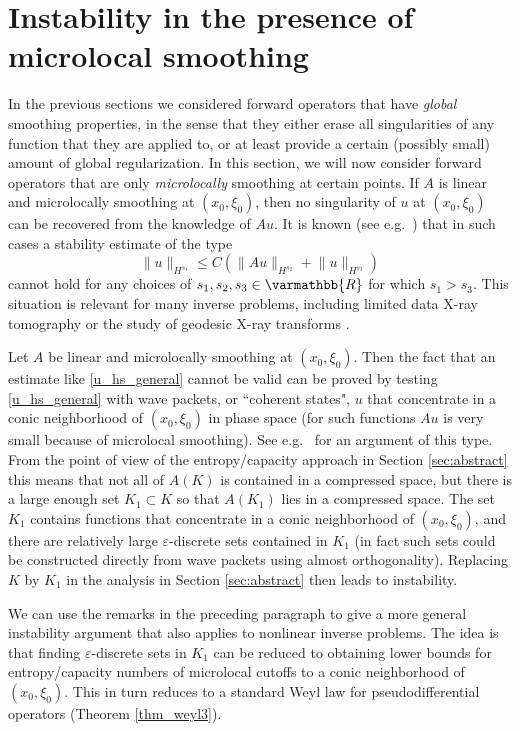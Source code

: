 \documentclass[12pt,twoside]{amsart}
\numberwithin{equation}{section}
\renewcommand{\leq}{\leqslant}
\renewcommand{\mathbb}{\varmathbb}
\newcommand{\mR}{\mathbb{R}}                    %
\newcommand{\norm}[1]{\lVert #1 \rVert}         %
\newcommand{\eps}{\varepsilon}
\begin{document}
\section{Instability in the presence of microlocal smoothing}
\label{sec:micro_smooth_1}

In the previous sections we considered forward operators that have \emph{global} smoothing properties, in the sense that they either erase all singularities of any function that they are applied to, or at least provide a certain (possibly small) amount of global regularization. In this section, we will now consider forward operators that are only \emph{microlocally} smoothing at certain points. If $A$ is linear and microlocally smoothing at $(x_0, \xi_0)$, then no singularity of $u$ at $(x_0,\xi_0)$ can be recovered from the knowledge of $Au$. It is known (see e.g.\ \cite[Theorem 4.4]{MSU15}) that in such cases a stability estimate of the type 
\begin{equation} \label{u_hs_general}
\norm{u}_{H^{s_1}} \leq C(\norm{Au}_{H^{s_2}} + \norm{u}_{H^{s_3}})
\end{equation}
cannot hold for any choices of $s_1, s_2, s_3 \in \mR$ for which $s_1 > s_3$. This situation is relevant for many inverse problems, including limited data X-ray tomography \cite{Quinto, Quinto1} or the study of geodesic X-ray transforms \cite{MSU15}.

Let $A$ be linear and microlocally smoothing at $(x_0, \xi_0)$. Then the fact that an estimate like \eqref{u_hs_general} cannot be valid can be proved by testing \eqref{u_hs_general} with wave packets, or ``coherent states", $u$ that concentrate in a conic neighborhood of $(x_0, \xi_0)$ in phase space (for such functions $Au$ is very small because of microlocal smoothing). See e.g.\ \cite[Proposition 5]{SU09} for an argument of this type. From the point of view of the entropy/capacity approach in Section \ref{sec:abstract} this means that not all of $A(K)$ is contained in a compressed space, but there is a large enough set $K_1 \subset K$ so that $A(K_1)$ lies in a compressed space. The set $K_1$ contains functions that concentrate in a conic neighborhood of $(x_0, \xi_0)$, and there are relatively large $\eps$-discrete sets contained in $K_1$ (in fact such sets could be constructed directly from wave packets using almost orthogonality). Replacing $K$ by $K_1$ in the analysis in Section \ref{sec:abstract} then leads to instability.

We can use the remarks in the preceding paragraph to give a more general instability argument that also applies to nonlinear inverse problems. The idea is that finding $\eps$-discrete sets in $K_1$ can be reduced to obtaining lower bounds for entropy/capacity numbers of microlocal cutoffs to a conic neighborhood of $(x_0, \xi_0)$. This in turn reduces to a standard Weyl law for pseudodifferential operators (Theorem \ref{thm_weyl3}).
\end{document}

